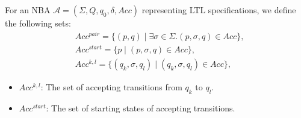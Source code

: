 For an NBA $\mathcal{A} = (\Sigma, Q, q_0, \delta, Acc)$ representing LTL specifications, we define the following sets:
\begin{align}
  & Acc^{pair} = \{(p, q) \mid \exists \sigma \in \Sigma. (p, \sigma, q) \in Acc \}, \label{atpair}\\
  & Acc^{start} = \{p \mid (p, \sigma, q) \in Acc \}, \label{atstart}\\
  & Acc^{k, l} = \{(q_k, \sigma, q_l) \mid (q_k, \sigma, q_l) \in Acc \}, \label{atkl}
\end{align}
\begin{itemize}
    \item $Acc^{k,l}$: The set of accepting transitions from $q_k$ to $q_l$.
    \item $Acc^{start}$: The set of starting states of accepting transitions.
\end{itemize}



